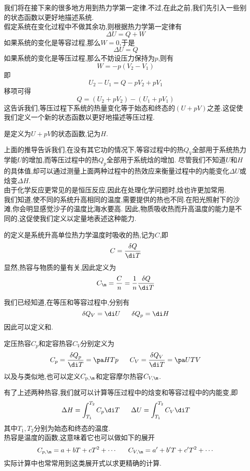 \documentclass{ctexart}
\begin{document}
我们将在接下来的很多地方用到热力学第一定律.不过,在此之前,我们先引入一些别的状态函数以更好地描述系统.\vspace{12pt}\\
\indent 假定系统在变化过程中不做其余功,则根据热力学第一定律有
\[\Delta U=Q+W\]
如果系统的变化是等容过程,那么$W=0$,于是
\[\Delta U=Q\]
如果系统的变化是等压过程,那么不妨设压力保持为$p$,则有
\[W=-p\left(V_2-V_1\right)\]
即
\[U_2-U_1=Q-pV_2+pV_1\]
移项可得
\[Q=\left(U_2+pV_2\right)-\left(U_1+pV_1\right)\]
这告诉我们,等压过程下系统的热量变化等于始态和终态的$(U+pV)$之差.这促使我们定义一个新的状态函数以更好地描述等压过程.
\begin{definition}[2B.2.1 焓]
    是定义为$U+pV$的状态函数,记为$H$.
\end{definition}
上面的推导告诉我们,在没有其它功的情况下,等容过程中的热$Q_V$全部用于系统热力学能$U$的增加,而等压过程中的热$Q_p$全部用于系统焓的增加.%
尽管我们不知道$U$和$H$的具体值,却可以通过测量上面两种过程中的热效应来衡量过程中的内能变化$\Delta U$或焓变$\Delta H$.\\
\indent 由于化学反应更常见的是恒压反应,因此在处理化学问题时,焓也许更加常用.\vspace{4pt}\\
\indent 我们知道,使不同的系统升高相同的温度,需要提供的热也不同.在阳光照射下的沙滩,你会明显感觉沙子的温度比海水要高.%
因此,物质吸收热而升高温度的能力是不同的,这促使我们定义以定量地表述这种能力.
\begin{definition}[2B.2.2 热容]
    的定义是系统升高单位热力学温度时吸收的热,记为$C$,即
    \[C=\dfrac{\delta Q}{\di T}\]
    显然,热容与物质的量有关,因此定义为
    \[C_\m=\dfrac{C}{n}=\dfrac1n\dfrac{\delta Q}{\di T}\]

\end{definition}
我们已经知道,在等压和等容过程中,分别有
\[\delta Q_V=\di U\ \ \ \ \ \delta Q_p=\di H\]
\indent 因此可以定义和.
\begin{definition}[2B.2.3 定压热容和定容热容]
    定压热容$C_p$和定容热容$C_V$分别定义为
    \[C_p=\dfrac{\delta Q_p}{\di T}=\pa HTp\ \ \ \ \ C_V=\dfrac{\delta Q_V}{\di T}=\pa UTV\]
    以及与类似地,也可以定义$C_{\text p,\m}$和定容摩尔热容$C_{V,\m}$.
\end{definition}
有了上述两种热容,我们就可以计算等压过程中的焓变和等容过程中的内能变,即
\[\Delta H=\int_{T_1}^{T_2}C_p\di T\ \ \ \ \ \Delta U=\int_{T_1}^{T_2}C_V\di T\]
其中$T_1,T_2$分别为始态和终态的温度.\\
\indent 热容是温度的函数,这意味着它也可以做如下的展开
\[C_{p,\m}=a+bT+cT^2+\cdots\ \ \ \ \ C_{V,\m}=a'+b'T+c'T^2+\cdots\]
实际计算中也常常用到这类展开式以求更精确的计算.
\end{document}
